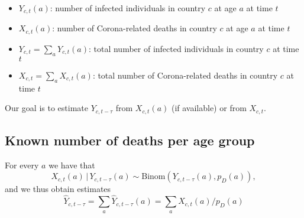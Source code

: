 \documentclass[a4paper]{article}
\renewcommand\P{\mathbb{P}}
\newcommand{\given}{\, \vert \,}
\begin{document}
\begin{itemize}
\item $Y_{c,t}(a)$: number of infected individuals in country $c$ at age $a$ at time $t$
\item $X_{c,t}(a)$: number of Corona-related deaths in country $c$ at age $a$ at time $t$
\item $Y_{c,t} = \sum_a Y_{c,t}(a)$: total number of infected individuals in country $c$ at time $t$
\item $X_{c,t} = \sum_a X_{c,t}(a)$: total number of Corona-related deaths in country $c$ at time $t$
\end{itemize}
%
Our goal is to estimate $Y_{c,t-\tau}$ from $X_{c,t}(a)$ (if available) or from $X_{c,t}$. 

\subsection{Known number of deaths per age group}
%
For every $a$ we have that 
$$X_{c,t}(a) \given Y_{c,t-\tau}(a) \sim \text{Binom}(Y_{c,t-\tau}(a), p_D(a)),$$
and we thus obtain estimates 
$$\hat{Y}_{c,t-\tau} = \sum_a \hat{Y}_{c,t-\tau}(a) =\sum_a  X_{c,t}(a) / p_D(a)$$
\end{document}
